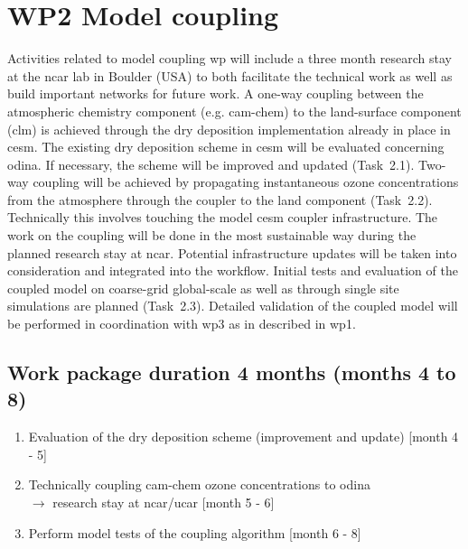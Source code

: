 \section{WP2 Model coupling}
\label{sec:wp2}
Activities related to model coupling \gls{wp} will include a three month research stay at the \gls{ncar} lab in Boulder (USA) to both facilitate the technical work as well as build important networks for future work. A one-way coupling between the atmospheric chemistry component (e.g. \gls{cam}-chem) to the land-surface component (\gls{clm}) is achieved through the dry deposition implementation already in place in \gls{cesm}. The existing dry deposition scheme in \gls{cesm} will be evaluated concerning \gls{odina}. If necessary, the scheme will be improved and updated (Task~2.1). Two-way coupling will be achieved by propagating instantaneous ozone concentrations from the atmosphere through the coupler to the land component (Task~2.2). Technically this involves touching the model \gls{cesm} coupler infrastructure. The work on the coupling will be done in the most sustainable way during the planned research stay at \gls{ncar}. Potential infrastructure updates will be taken into consideration and integrated into the workflow. Initial tests and evaluation of the coupled model on coarse-grid global-scale as well as through  single site simulations are planned (Task~2.3). Detailed validation of the coupled model will be performed in coordination with \gls{wp}3 as in described in \gls{wp}1.

\subsection*{Work package duration 4 months (months 4 to 8)}
\begin{enumerate}[start=1,label={T2.\arabic*}]
  \itemsep0pt
\item Evaluation of the dry deposition scheme (improvement and update) \hfill [month 4 - 5]
\item Technically coupling \gls{cam}-chem ozone concentrations to \gls{odina} \\$\rightarrow$ research stay at \gls{ncar}/\gls{ucar} \hfill [month 5 - 6]
\item Perform model  tests of the coupling algorithm \hfill [month 6 - 8]
\end{enumerate}

